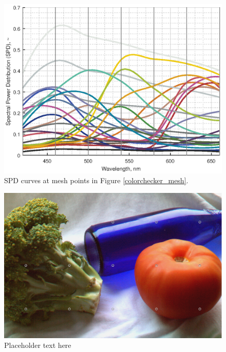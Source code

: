 \documentclass[twocolumn,10pt]{asme2ej}
\begin{document}
\begin{figure}[H]
\begin{centering}
  \includegraphics[height=0.6\linewidth]{colorchecker.eps}
  \caption{SPD curves at mesh points in Figure \ref{colorchecker_mesh}.}
  \label{colorchecker_SPDs}
    \end{centering}
\end{figure}

\clearpage


\begin{figure}[H]
\begin{centering}
  \includegraphics[height=0.55\linewidth]{broccoli_bottle_tomato.png}
  \caption{Placeholder text here}
  \label{tomato_mesh}
  \end{centering}
\end{figure}
\end{document}
